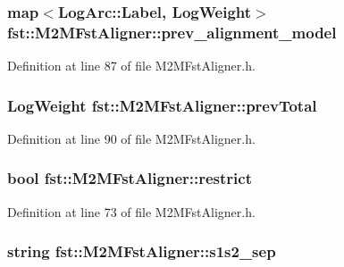 \subsubsection[{prev\+\_\+alignment\+\_\+model}]{\setlength{\rightskip}{0pt plus 5cm}map$<$Log\+Arc\+::\+Label, Log\+Weight$>$ fst\+::\+M2\+M\+Fst\+Aligner\+::prev\+\_\+alignment\+\_\+model}\hypertarget{classfst_1_1_m2_m_fst_aligner_abbfbf7af9e7ed78f02dc11b3573fcafa}{}\label{classfst_1_1_m2_m_fst_aligner_abbfbf7af9e7ed78f02dc11b3573fcafa}


Definition at line 87 of file M2\+M\+Fst\+Aligner.\+h.

\subsubsection[{prev\+Total}]{\setlength{\rightskip}{0pt plus 5cm}Log\+Weight fst\+::\+M2\+M\+Fst\+Aligner\+::prev\+Total}\hypertarget{classfst_1_1_m2_m_fst_aligner_ac79327f76616e526a76c414c897af138}{}\label{classfst_1_1_m2_m_fst_aligner_ac79327f76616e526a76c414c897af138}


Definition at line 90 of file M2\+M\+Fst\+Aligner.\+h.

\subsubsection[{restrict}]{\setlength{\rightskip}{0pt plus 5cm}bool fst\+::\+M2\+M\+Fst\+Aligner\+::restrict}\hypertarget{classfst_1_1_m2_m_fst_aligner_a11bb481204d03c4019f3fc0644da9320}{}\label{classfst_1_1_m2_m_fst_aligner_a11bb481204d03c4019f3fc0644da9320}


Definition at line 73 of file M2\+M\+Fst\+Aligner.\+h.

\subsubsection[{s1s2\+\_\+sep}]{\setlength{\rightskip}{0pt plus 5cm}string fst\+::\+M2\+M\+Fst\+Aligner\+::s1s2\+\_\+sep}\hypertarget{classfst_1_1_m2_m_fst_aligner_ae495dc0a0762485ad6b797bfe656cf53}{}\label{classfst_1_1_m2_m_fst_aligner_ae495dc0a0762485ad6b797bfe656cf53}


